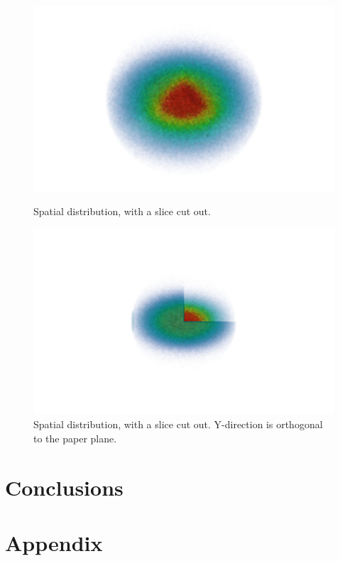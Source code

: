 \documentclass[english, a4paper]{article}
\begin{document}
\begin{figure}[H]
\begin{minipage}[t]{0.48\linewidth}
  \includegraphics[width=\textwidth]{../modifiedMortenCode/figures/interactingDistribution3.png}
  \caption{Spatial distribution, with a slice cut out.}
  \label{fig:spatialDistribution}
\end{minipage}
\quad
\begin{minipage}[t]{0.48\linewidth}
\includegraphics[width=\textwidth]{../modifiedMortenCode/figures/interactingDistributionXZ.png}
  \caption{Spatial distribution, with a slice cut out. Y-direction is orthogonal to the paper plane.}
  \label{fig:spatialDistribution2}
\end{minipage}
\end{figure}

\section{Conclusions}


\section{Appendix}


\end{document}
